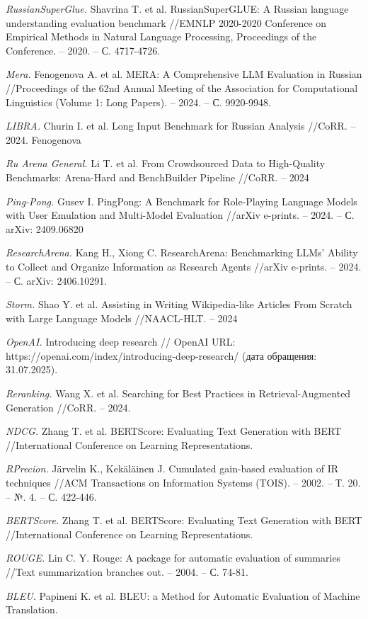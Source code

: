 \documentclass{article}
\theoremstyle{definition}
\theoremstyle{plain}
\begin{document}
\renewcommand\refname{References}

\begin{thebibliography}{99}

\textit{RussianSuperGlue.}
Shavrina T. et al. RussianSuperGLUE: A Russian language understanding evaluation benchmark //EMNLP 2020-2020 Conference on Empirical Methods in Natural Language Processing, Proceedings of the Conference. – 2020. – С. 4717-4726.

\textit{Mera.}
Fenogenova A. et al. MERA: A Comprehensive LLM Evaluation in Russian //Proceedings of the 62nd Annual Meeting of the Association for Computational Linguistics (Volume 1: Long Papers). – 2024. – С. 9920-9948.

\textit{LIBRA.}
Churin I. et al. Long Input Benchmark for Russian Analysis //CoRR. – 2024. Fenogenova 

\textit{Ru Arena General.}
Li T. et al. From Crowdsourced Data to High-Quality Benchmarks: Arena-Hard and BenchBuilder Pipeline //CoRR. – 2024

\textit{Ping-Pong.}
Gusev I. PingPong: A Benchmark for Role-Playing Language Models with User Emulation and Multi-Model Evaluation //arXiv e-prints. – 2024. – С. arXiv: 2409.06820

\textit{ResearchArena.}
Kang H., Xiong C. ResearchArena: Benchmarking LLMs' Ability to Collect and Organize Information as Research Agents //arXiv e-prints. – 2024. – С. arXiv: 2406.10291.

\textit{Storm.}
Shao Y. et al. Assisting in Writing Wikipedia-like Articles From Scratch with Large Language Models //NAACL-HLT. – 2024

\textit{OpenAI.}
Introducing deep research // OpenAI URL: https://openai.com/index/introducing-deep-research/ (дата обращения: 31.07.2025).

\textit{Reranking.}
Wang X. et al. Searching for Best Practices in Retrieval-Augmented Generation //CoRR. – 2024.

\textit{NDCG.}
Zhang T. et al. BERTScore: Evaluating Text Generation with BERT //International Conference on Learning Representations.

\textit{RPrecion.}
Järvelin K., Kekäläinen J. Cumulated gain-based evaluation of IR techniques //ACM Transactions on Information Systems (TOIS). – 2002. – Т. 20. – №. 4. – С. 422-446.

\textit{BERTScore.}
Zhang T. et al. BERTScore: Evaluating Text Generation with BERT //International Conference on Learning Representations.


\textit{ROUGE.}
Lin C. Y. Rouge: A package for automatic evaluation of summaries //Text summarization branches out. – 2004. – С. 74-81.

\textit{BLEU.}
Papineni K. et al. BLEU: a Method for Automatic Evaluation of Machine Translation.

\end{thebibliography}
\end{document}
